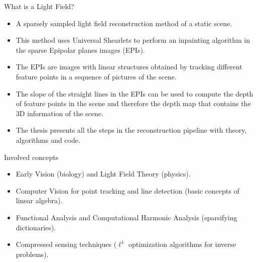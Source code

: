 
\begin{frame}{What is a Light Field?}
\begin{block}{}
\begin{itemize}
\item A sparsely sampled light field reconstruction method of a static scene. 

\bigskip
\pause
\item This method uses Universal Shearlets to perform an inpainting algorithm in the sparse Epipolar planes images (EPIs).

\bigskip 
\pause
\item The EPIs are images with linear structures obtained by tracking different feature points in a sequence of pictures of the scene. 

\bigskip
\pause
\item The slope of the straight lines in the EPIs can be used to compute the depth of feature points in the scene and therefore the depth map that contains the 3D information of the scene.

\bigskip
\pause
\item The thesis presents all the steps in the reconstruction pipeline with theory, algorithms and code. 
\end{itemize} 
\end{block}
\end{frame}

\begin{frame}{Involved concepts}
\begin{block}{}
\begin{itemize}
\item Early Vision (biology) and Light Field Theory (physics).

\bigskip
\pause
\item Computer Vision for point tracking and line detection (basic concepts of linear algebra).

\bigskip 
\pause
\item Functional Analysis and Computational Harmonic Analysis (sparsifying dictionaries).

\bigskip
\pause
\item Compressed sensing techniques ($\ell^1$ optimization algorithms for inverse problems). 
\end{itemize}
\end{block}
\end{frame}

